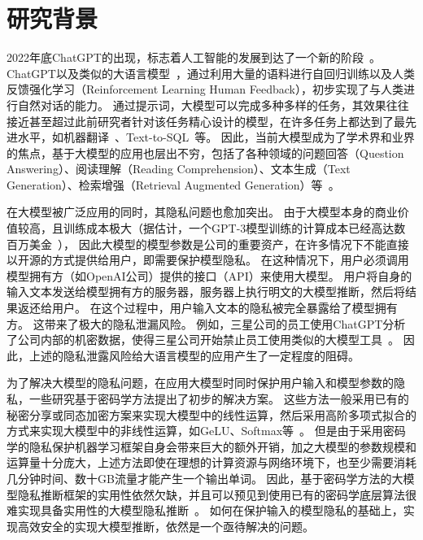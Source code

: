 \section{研究背景}
2022年底ChatGPT的出现，标志着人工智能的发展到达了一个新的阶段~\cite{chatgpt}。
%
ChatGPT以及类似的大语言模型~\cite{touvron_2023_llama,zeng_2022_glm130b,jiang_2023_mistral,2023_gemini}，通过利用大量的语料进行自回归训练以及人类反馈强化学习（Reinforcement Learning Human Feedback），初步实现了与人类进行自然对话的能力。
%
通过提示词，大模型可以完成多种多样的任务，其效果往往接近甚至超过此前研究者针对该任务精心设计的模型，在许多任务上都达到了最先进水平，如机器翻译~\cite{jiaowenxiang_2023_llm_translation}、Text-to-SQL~\cite{gaodawei_2024_text2sql_llm}等。
%
因此，当前大模型成为了学术界和业界的焦点，基于大模型的应用也层出不穷，包括了各种领域的问题回答（Question Answering）、阅读理解（Reading Comprehension）、文本生成（Text Generation）、检索增强（Retrieval Augmented Generation）等~\cite{zhao_2023_llm_survey}。


在大模型被广泛应用的同时，其隐私问题也愈加突出。
%
由于大模型本身的商业价值较高，且训练成本极大（据估计，一个GPT-3模型训练的计算成本已经高达数百万美金~\cite{gpt3_technical_report}），
因此大模型的模型参数是公司的重要资产，在许多情况下不能直接以开源的方式提供给用户，即需要保护模型隐私。
%
在这种情况下，用户必须调用模型拥有方（如OpenAI公司）提供的接口（API）来使用大模型。
%
用户将自身的输入文本发送给模型拥有方的服务器，服务器上执行明文的大模型推断，然后将结果返还给用户。
%
在这个过程中，用户输入文本的隐私被完全暴露给了模型拥有方。
%
这带来了极大的隐私泄漏风险。
%
例如，三星公司的员工使用ChatGPT分析了公司内部的机密数据，使得三星公司开始禁止员工使用类似的大模型工具~\cite{samsung_chatgpt_leak}。
%
因此，上述的隐私泄露风险给大语言模型的应用产生了一定程度的阻碍。


为了解决大模型的隐私问题，在应用大模型时同时保护用户输入和模型参数的隐私，一些研究基于密码学方法提出了初步的解决方案。
%
这些方法一般采用已有的秘密分享或同态加密方案来实现大模型中的线性运算，然后采用高阶多项式拟合的方式来实现大模型中的非线性运算，如GeLU、Softmax等~\cite{pang_2024_bolt_transformer,hou2023ciphergpt,dong2023puma,lu2023bumblebee}。
%
但是由于采用密码学的隐私保护机器学习框架自身会带来巨大的额外开销，加之大模型的参数规模和运算量十分庞大，上述方法即使在理想的计算资源与网络环境下，也至少需要消耗几分钟时间、数十GB流量才能产生一个输出单词。
%
因此，基于密码学方法的大模型隐私推断框架的实用性依然欠缺，并且可以预见到使用已有的密码学底层算法很难实现具备实用性的大模型隐私推断~\cite{hou2023ciphergpt}。
%
如何在保护输入的模型隐私的基础上，实现高效安全的实现大模型推断，依然是一个亟待解决的问题。
